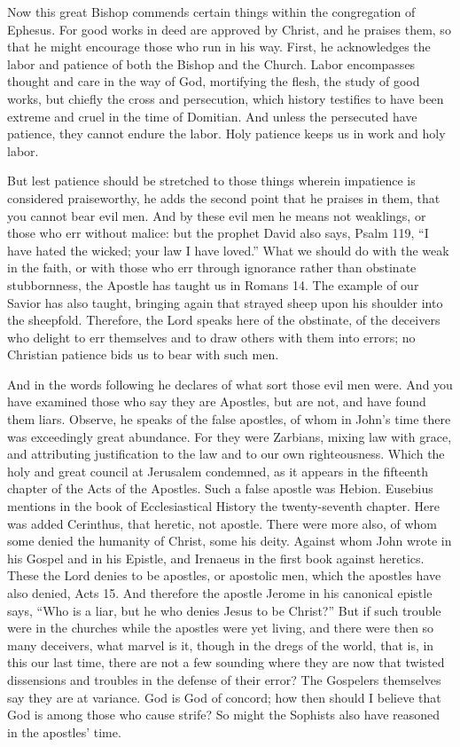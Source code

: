 Now this great Bishop commends certain things within the congregation of Ephesus. For good works in deed are approved by Christ, and he praises them, so that he might encourage those who run in his way. First, he acknowledges the labor and patience of both the Bishop and the Church. Labor encompasses thought and care in the way of God, mortifying the flesh, the study of good works, but chiefly the cross and persecution, which history testifies to have been extreme and cruel in the time of Domitian. And unless the persecuted have patience, they cannot endure the labor. Holy patience keeps us in work and holy labor.

But lest patience should be stretched to those things wherein impatience is considered praiseworthy, he adds the second point that he praises in them, that you cannot bear evil men. And by these evil men he means not weaklings, or those who err without malice: but the prophet David also says, Psalm 119, “I have hated the wicked; your law I have loved.” What we should do with the weak in the faith, or with those who err through ignorance rather than obstinate stubbornness, the Apostle has taught us in Romans 14. The example of our Savior has also taught, bringing again that strayed sheep upon his shoulder into the sheepfold. Therefore, the Lord speaks here of the obstinate, of the deceivers who delight to err themselves and to draw others with them into errors; no Christian patience bids us to bear with such men.

And in the words following he declares of what sort those evil men were. And you have examined those who say they are Apostles, but are not, and have found them liars. Observe, he speaks of the false apostles, of whom in John’s time there was exceedingly great abundance. For they were Zarbians, mixing law with grace, and attributing justification to the law and to our own righteousness. Which the holy and great council at Jerusalem condemned, as it appears in the fifteenth chapter of the Acts of the Apostles. Such a false apostle was Hebion. Eusebius mentions in the book of Ecclesiastical History the twenty-seventh chapter. Here was added Cerinthus, that heretic, not apostle. There were more also, of whom some denied the humanity of Christ, some his deity. Against whom John wrote in his Gospel and in his Epistle, and Irenaeus in the first book against heretics. These the Lord denies to be apostles, or apostolic men, which the apostles have also denied, Acts 15. And therefore the apostle Jerome in his canonical epistle says, “Who is a liar, but he who denies Jesus to be Christ?” But if such trouble were in the churches while the apostles were yet living, and there were then so many deceivers, what marvel is it, though in the dregs of the world, that is, in this our last time, there are not a few sounding where they are now that twisted dissensions and troubles in the defense of their error? The Gospelers themselves say they are at variance. God is God of concord; how then should I believe that God is among those who cause strife? So might the Sophists also have reasoned in the apostles’ time.


